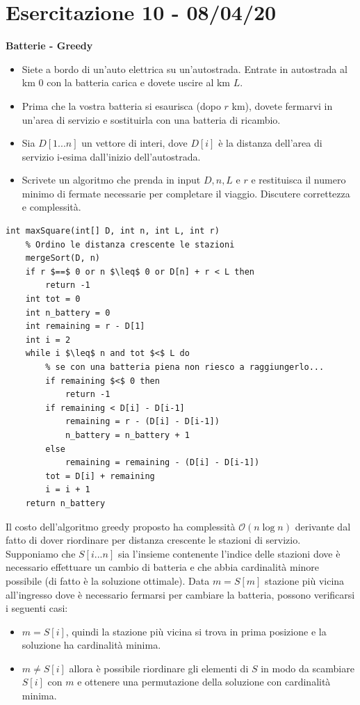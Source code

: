 \documentclass[../cheatSheetAlgoritmi.tex]{subfiles}
\begin{document}
\section{Esercitazione 10 - 08/04/20}
\textbf{Batterie - Greedy}
\begin{itemize}
	\item Siete a bordo di un'auto elettrica su un'autostrada. Entrate in autostrada al km 0 con la batteria carica e dovete uscire al km $L$.
	\item Prima che la vostra batteria si esaurisca (dopo $r$ km), dovete fermarvi in un'area di servizio e sostituirla con una batteria di ricambio.
	\item Sia $D[1...n]$ un vettore di interi, dove $D[i]$ è la distanza dell'area di servizio i-esima dall'inizio dell'autostrada.
	\item Scrivete un algoritmo che prenda in input $D,n,L$ e $r$ e restituisca il numero minimo di fermate necessarie per completare il viaggio. Discutere correttezza e complessità.
\end{itemize}
\begin{lstlisting}[caption=Batterie Greedy]
int maxSquare(int[] D, int n, int L, int r)
	% Ordino le distanza crescente le stazioni
	mergeSort(D, n)
	if r $==$ 0 or n $\leq$ 0 or D[n] + r < L then
		return -1
	int tot = 0
	int n_battery = 0
	int remaining = r - D[1]
	int i = 2
	while i $\leq$ n and tot $<$ L do
		% se con una batteria piena non riesco a raggiungerlo...
		if remaining $<$ 0 then
			return -1
		if remaining < D[i] - D[i-1]
			remaining = r - (D[i] - D[i-1])
			n_battery = n_battery + 1
		else
			remaining = remaining - (D[i] - D[i-1])
		tot = D[i] + remaining
		i = i + 1
	return n_battery
\end{lstlisting}
Il costo dell'algoritmo greedy proposto ha complessità $\mathcal{O}(n \log n)$ derivante dal fatto di dover riordinare per distanza crescente le stazioni di servizio. Supponiamo che $S[i...n]$ sia l'insieme contenente l'indice delle stazioni dove è necessario effettuare un cambio di batteria e che abbia cardinalità minore possibile (di fatto è la soluzione ottimale). Data $m = S[m]$ stazione più vicina all'ingresso dove è necessario fermarsi per cambiare la batteria, possono verificarsi i seguenti casi:
\begin{itemize}
	\item $m = S[i]$, quindi la stazione più vicina si trova in prima posizione e la soluzione ha cardinalità minima.
	\item $m \neq S[i]$ allora è possibile riordinare gli elementi di $S$ in modo da scambiare $S[i]$ con $m$ e ottenere una permutazione della soluzione con cardinalità minima.
\end{itemize}
 
\end{document}
